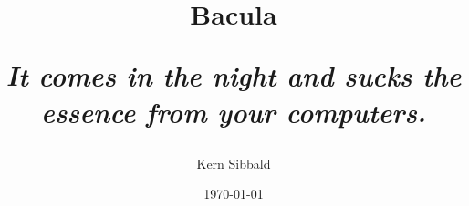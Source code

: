 \documentclass[11pt,a4paper]{article}
\begin{document}



\title{{\bighead Bacula}
   \parbox{5.0in}{\Large \sl \bigskip \bigskip \bigskip
        It comes in the night and sucks the essence
        from your computers.} }

\author{Kern Sibbald}
\date{\vspace{2.0in}\today}
\maketitle

\tableofcontents
\listoftables
\listoffigures









\end{document}
